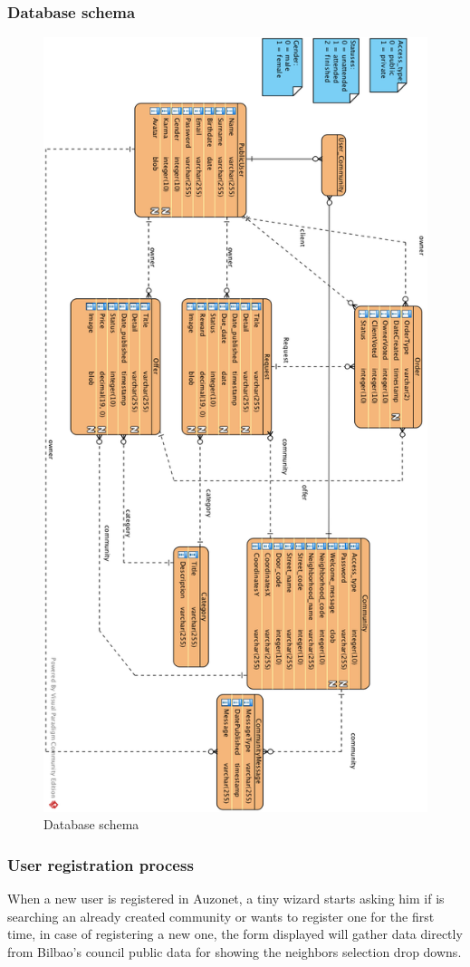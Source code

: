 \documentclass{DeustoFDP}
\begin{document}
\subsubsection{Database schema}
\begin{figure}[h!]
\centering
\includegraphics[width=0.7\linewidth]{fig/DatabaseUML}
\caption[Database schema]{Database schema}
\label{fig:DatabaseUML}
\end{figure}
\newpage
\subsubsection{User registration process}
When a new user is registered in Auzonet, a tiny wizard starts asking him if is searching an already created community or wants to register one for the first time, in case of registering a new one, the form displayed will gather data directly from Bilbao's council public data for showing the neighbors selection drop downs.
\end{document}

